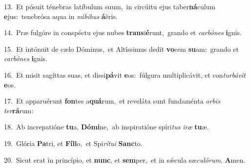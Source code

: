 {\numbfont\textcolor{\numbcolor}{13.}}~Et pósuit ténebras latíbulum suum,~\dagger in circúitu ejus taber\-\textbf{ná}\-culum \textbf{e}\-jus:~\star tenebrósa aqua in \textit{nú}\-\textit{bi}\textit{bus} \textbf{á}\-ëris.\par
{\numbfont\textcolor{\numbcolor}{14.}}~Præ fulgóre in conspéctu ejus nubes \textbf{trans}\-i\-\textbf{é}\-runt,~\star grando et \textit{car}\-\textit{bó}\textit{nes} \textbf{i}\-gnis.\par
{\numbfont\textcolor{\numbcolor}{15.}}~Et intónuit de cælo Dóminus,~\dagger et Altíssimus dedit \textbf{vo}\-cem \textbf{su}\-am:~\star grando et \textit{car}\-\textit{bó}\textit{nes} \textbf{i}\-gnis.\par
{\numbfont\textcolor{\numbcolor}{16.}}~Et misit sagíttas suas, et dissi\-\textbf{pá}\-vit \textbf{e}\-os:~\star fúlgura multiplicávit, et con\-\textit{tur}\-\textit{bá}\textit{vit} \textbf{e}\-os.\par
{\numbfont\textcolor{\numbcolor}{17.}}~Et apparuérunt \textbf{fon}\-tes a\-\textbf{quá}\-rum,~\star et reveláta sunt fundaménta \textit{or}\-\textit{bis} \textit{ter}\-\textbf{rá}rum:\par
{\numbfont\textcolor{\numbcolor}{18.}}~Ab increpatióne \textbf{tu}\-a, \textbf{Dó}\-\textbf{mi}ne,~\star ab inspiratióne spíri\textit{tus} \textit{i}\-\textit{ræ} \textbf{tu}\-æ.\par
{\numbfont\textcolor{\numbcolor}{19.}}~Glória \textbf{Pa}\-tri, et \textbf{Fí}\-\textbf{li}o,~\star et Spi\-\textit{rí}\-\textit{tu}\textit{i} \textbf{Sanc}\-to.\par
{\numbfont\textcolor{\numbcolor}{20.}}~Sicut erat in princípio, et \textbf{nunc}\-, et \textbf{sem}\-per,~\star et in sǽcula sæ\-\textit{cu}\-\textit{ló}\textit{rum}. \textbf{A}\-men.\par
